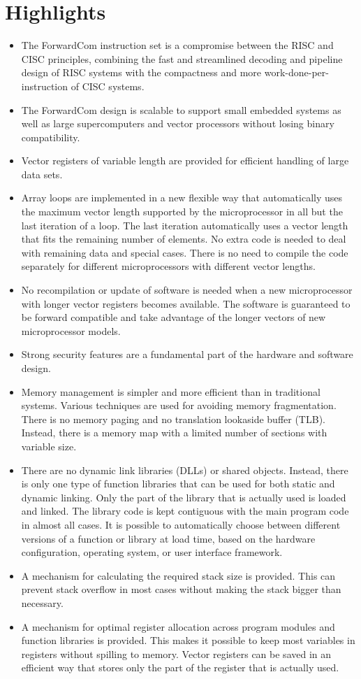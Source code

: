 \documentclass[forwardcom.tex]{subfiles}
\begin{document}
\section{Highlights}
\begin{itemize}
\item The ForwardCom instruction set is a compromise between the RISC and CISC principles, combining the fast and streamlined decoding and pipeline design of RISC systems with the compactness and more work-done-per-instruction of CISC systems.
\item The ForwardCom design is scalable to support small embedded systems as well as large supercomputers and vector processors without losing binary compatibility.
\item Vector registers of variable length are provided for efficient handling of large data sets.
\item Array loops are implemented  in a new flexible way that automatically uses the maximum vector length supported by the microprocessor in all but the last iteration of a loop. The last iteration automatically uses a vector length that fits the remaining number of elements. No extra code is needed to deal with remaining data and special cases. There is no need to compile the code separately for different microprocessors with different vector lengths.
\item No recompilation or update of software is needed when a new microprocessor with longer vector registers becomes available. The software is guaranteed to be forward compatible and take advantage of the longer vectors
of new microprocessor models.
\item Strong security features are a fundamental part of the hardware and software design.
\item Memory management is simpler and more efficient than in traditional systems. 
Various techniques are used for avoiding memory 
fragmentation. There is no memory paging and no translation lookaside buffer (TLB). Instead, there is a memory map with a limited number of sections with variable size.
\item There are no dynamic link libraries (DLLs) or shared objects. Instead, there is only one type of function libraries 
that can be used for both static and dynamic linking. Only the part of the library that is actually used is loaded and linked. The library code is kept contiguous with the main program code in almost all cases. It is possible to automatically choose between different versions of a function or library at load time, based on the hardware configuration, operating system, or user interface framework.
\item A mechanism for calculating the required stack size is provided. This can prevent stack overflow in most cases without making the stack bigger than necessary.
\item A mechanism for optimal register allocation across program modules and function libraries is provided. This makes it possible to keep most variables in registers without spilling to memory. Vector registers can be saved in an efficient way that stores only the part of the register that is actually used.
\end{itemize}
\end{document}
